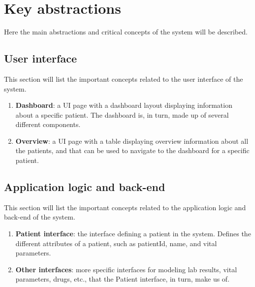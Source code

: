 \documentclass[10pt,a4paper]{article}
\begin{document}
\section{Key abstractions}
Here the main abstractions and critical concepts of the system will be described.
\subsection{User interface}
This section will list the important concepts related to the user interface of the system.
\begin{enumerate}
    \item \textbf{Dashboard}: a UI page with a dashboard layout displaying information about a specific patient. The dashboard is, in turn, made up of several different components.
        \linebreak{}
      \item \textbf{Overview}: a UI page with a table displaying overview information about all the patients, and that can be used to navigate to the dashboard for a specific patient. 
    \linebreak{}
\end{enumerate}

\subsection{Application logic and back-end}
This section will list the important concepts related to the application logic and back-end of the system.
\begin{enumerate}
    \item \textbf{Patient interface}: the interface defining a patient in the system. Defines the different attributes of a patient, such as patientId, name, and vital parameters.
        \linebreak{}

    \item \textbf{Other interfaces}: more specific interfaces for modeling lab results, vital parameters, drugs, etc., that the Patient interface, in turn, make us of.
        \linebreak{}
\end{enumerate}
\end{document}
